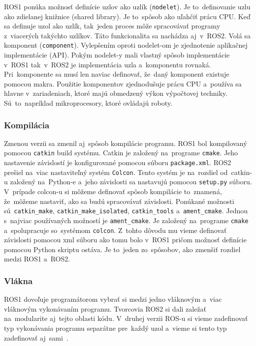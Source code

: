 	ROS1 ponúka možnosť definície uzlov ako uzlík (\texttt{nodelet}). Je to~definovanie uzlu ako zdielanej knižnice (shared library). Je
	to~spôsob ako uľahčiť prácu CPU. Keď sa definuje uzol ako uzlík, tak~jeden proces môže spracovávať programy z~viacerých takýchto uzlíkov.
	Táto funkcionalita sa nachádza aj~v~ROS2. Volá sa komponent (\texttt{component}). Vylepšením oproti nodelet-om je zjednotenie aplikačnej
	implementácie (API). Pokým nodelet-y mali vlastný spôsob implementácie v~ROS1 tak~v~ROS2 je implementácia uzla a~komponentu rovnaká.
	Pri~komponente sa musí len naviac definovať, že~daný komponent existuje pomocou makra. Použitie komponentov zjednodušuje prácu CPU
	a~používa sa hlavne v~zariadeniach, ktoré majú obmedzený výkon výpočtovej techniky. Sú~to~napríklad mikroprocesory, ktoré ovládajú roboty.

\subsubsection{Kompilácia}

	Zmenou verzii sa zmenil aj~spôsob kompilácie programu. ROS1 bol kompilovaný pomocou \texttt{catkin} build systému. Catkin je založený
	na~programe \texttt{cmake}. Jeho nastavenie závislostí je konfigurované pomocou súboru \texttt{package.xml}. ROS2 prešiel na~viac
	nastaviteľný systém \texttt{Colcon}. Tento systém je na~rozdiel od~catkin-u založený na~Python-e a~jeho závislosti sa nastavujú pomocou
	\texttt{setup.py} súboru. V~prípade colcon-u si môžeme definovať spôsob kompilácie to~znamená, že~môžeme nastaviť, ako sa budú spracovávať
	závislosti. Ponúkané možnosti sú~\texttt{catkin\_make}, \texttt{catkin\_make\_isolated}, \texttt{catkin\_tools} a~\texttt{ament\_cmake}.
	Jednou s~najviac používaných možností je \texttt{ament\_cmake}. Je založený na~programe \texttt{cmake} a~spolupracuje so~systémom \texttt{colcon}.
	Z~tohto dôvodu mu vieme definovať závislosti pomocou xml súboru ako tomu bolo v~ROS1 pričom možnosť definície pomocou Python skriptu ostáva.
	Je to~jeden zo~spôsobov, ako zmenšiť rozdiel medzi ROS1 a~ROS2.

\subsubsection{Vlákna}

	ROS1 dovoľuje programátorom vybrať si medzi jedno vláknovým a~viac vláknovým vykonávaním programu. Tvorcovia ROS2 si dali zaležať na~modularite
	aj~tejto oblasti kódu. V~druhej verzii ROS-u si vieme zadefinovať typ vykonávania programu separátne pre~každý uzol a~vieme si tento typ
	zadefinovať aj~sami~\cite{ROS2design}.

